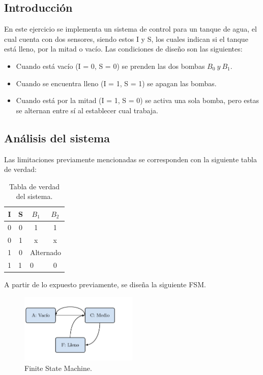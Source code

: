 \subsection{Introducción}

En este ejercicio se implementa un sistema de control para un tanque de agua, el cual cuenta con dos sensores, siendo estos I y S, los cuales indican si el tanque está lleno, por la mitad o vacío. Las condiciones de diseño son las siguientes:
\begin{itemize}
\item Cuando está vacío (I = 0, S = 0) se prenden las dos bombas $B_0 \ y \ B_1$.
\item Cuando se encuentra lleno (I = 1, S = 1) se apagan las bombas.
\item Cuando está por la mitad (I = 1, S = 0) se activa una sola bomba, pero estas se alternan entre sí al establecer cual trabaja.
\end{itemize}

\subsection{Análisis del sistema}
Las limitaciones previamente mencionadas se corresponden con la siguiente tabla de verdad:
\begin{table}[H]
\centering
\begin{tabular}{cccc}
\hline
\textbf{I}              & \textbf{S}             & \textbf{$B_1$}         & \textbf{$B_2$} \\ \hline
0                       & 0                      & 1                      & 1              \\ 
0                       & 1                      & x                      & x              \\ 
1                       & 0                      & \multicolumn{2}{c}{Alternado}          \\ 
\multicolumn{1}{l}{1} & \multicolumn{1}{l}{1} & \multicolumn{1}{l}{0} & 0              \\ \hline
\end{tabular}
\caption{Tabla de verdad del sistema.}
\end{table}

A partir de lo expuesto previamente, se diseña la siguiente FSM.
\begin{figure}[H]
	\centering
	\includegraphics[width=0.5\textwidth, page = 1]{ImagenesEjercicio1/FSM1.pdf}
	\caption{Finite State Machine.}
	\label{fig:fsm}
\end{figure}

